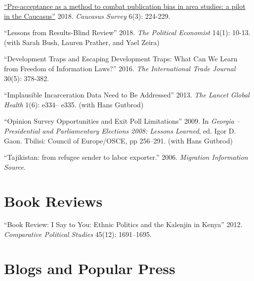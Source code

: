 \documentclass[margin,line]{res}
\begin{document}
{\begin{resume}
\renewcommand{\labelenumi}{O\theenumi.}

\begin{etaremune}
\item \href{https://doi.org/10.1080/23761199.2018.1522796}{``Pre-acceptance as a method to combat publication bias in area studies: a pilot in the Caucasus''} 2018.  \emph{Caucasus Survey} 6(3): 224-229.
    
\item ``Lessons from Results-Blind Review'' 2018.  \emph{The
    Political Economist} 14(1): 10-13. (with Sarah Bush, Lauren Prather, and Yael Zeira)

 \item ``Development Traps and Escaping Development Traps: What Can We
  Learn from Freedom of Information Laws?'' 2016. \emph{The
    International Trade Journal } 30(5): 378-382.

 \item  ``Implausible Incarceration Data Need to Be Addressed''
  2013. \emph{The Lancet Global Health} 1(6): e334-- e335. (with Hans
  Gutbrod)

 \item  ``Opinion Survey Opportunities and Exit Poll Limitations'' 2009. In
  \emph{Georgia -- Presidential and Parliamentary Elections 2008:
    Lessons Learned}, ed. Igor D. Gaon. Tbilisi: Council of
  Europe/OSCE, pp 256--291. (with Hans Gutbrod)

\item  ``Tajikistan: from refugee sender to labor exporter.''
  2006. \emph{Migration Information Source}.
\end{etaremune}

 
\section{\sc Book Reviews}
\renewcommand{\labelenumi}{R\theenumi.}

\begin{etaremune}
``Book Review: I Say to You: Ethnic Politics and the Kalenjin in
Kenya'' 2012. \emph{Comparative Political Studies} 45(12): 1691--1695.
\end{etaremune}

\section{\sc Blogs and Popular Press}
\renewcommand{\labelenumi}{M\theenumi.}

\begin{etaremune}


\end{etaremune}
\end{resume}}
\end{document}
